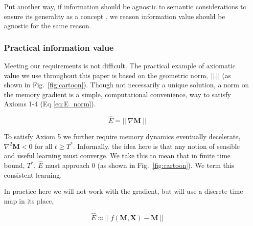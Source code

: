 Put another way, if information should be agnostic to semantic considerations to ensure its generality as a concept \cite{Shannon1948a}, we reason information value should be agnostic for the same reason.


\subsubsection*{Practical information value}
Meeting our requirements is not difficult. The practical example of axiomatic value we use throughout this paper is based on the geometric norm, $||.||$ (as shown in Fig.~\ref{fig:cartoon}). Though not necessarily a unique solution, a norm on the memory gradient is a simple, computational convenience, way to satisfy Axioms 1-4 (Eq \ref{eq:E_norm}). 

\begin{equation}
	\label{eq:E_norm}
	\hat E = || \ \nabla \mathbf{M} \ ||
\end{equation}

To satisfy Axiom 5 we further require memory dynamics eventually decelerate,  $\nabla^2 \mathbf{M} < 0$ for all $ t \ge T^*$. Informally, the idea here is that any notion of sensible and useful learning must converge. We take this to mean that in finite time bound, $T^*$, $\hat E$ must approach 0 (as shown in Fig.~\ref{fig:cartoon}). We term this consistent learning.

In practice here we will not work with the gradient, but will use a discrete time map in its place,

\begin{equation}
	\label{eq:E_norm_discrete}
	\hat E \approx || \ f(\mathbf{M},\mathbf{X}) - \mathbf{M} \ ||
\end{equation}

